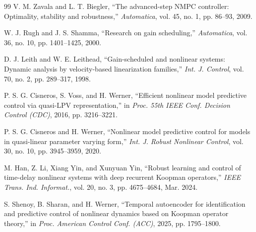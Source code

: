 \documentclass[journal]{IEEEtran}
\begin{document}
\begin{thebibliography}{99}
V. M. Zavala and L. T. Biegler, ``The advanced-step NMPC controller: Optimality, stability and robustness,'' \emph{Automatica}, vol. 45, no. 1, pp. 86--93, 2009.

W. J. Rugh and J. S. Shamma, ``Research on gain scheduling,'' \emph{Automatica}, vol. 36, no. 10, pp. 1401--1425, 2000.

D. J. Leith and W. E. Leithead, ``Gain-scheduled and nonlinear systems: Dynamic analysis by velocity-based linearization families,'' \emph{Int. J. Control}, vol. 70, no. 2, pp. 289--317, 1998.

P. S. G. Cisneros, S. Voss, and H. Werner, ``Efficient nonlinear model predictive control via quasi-LPV representation,'' in \emph{Proc. 55th IEEE Conf. Decision Control (CDC)}, 2016, pp. 3216--3221.

P. S. G. Cisneros and H. Werner, ``Nonlinear model predictive control for models in quasi-linear parameter varying form,'' \emph{Int. J. Robust Nonlinear Control}, vol. 30, no. 10, pp. 3945--3959, 2020.

M. Han, Z. Li, Xiang Yin, and Xunyuan Yin, ``Robust learning and control of time-delay nonlinear systems with deep recurrent Koopman operators,'' \emph{IEEE Trans. Ind. Informat.}, vol. 20, no. 3, pp. 4675--4684, Mar. 2024.

S. Shenoy, B. Sharan, and H. Werner, ``Temporal autoencoder for identification and predictive control of nonlinear dynamics based on Koopman operator theory,'' in \emph{Proc. American Control Conf. (ACC)}, 2025, pp. 1795--1800.

\end{thebibliography}
\end{document}
